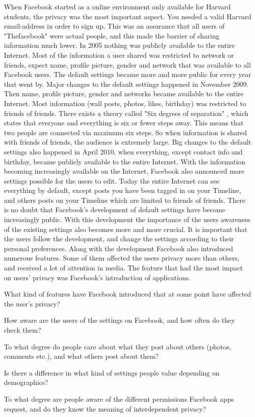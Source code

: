 When Facebook started as a online environment only available for Harvard students, the privacy was the most important aspect. You needed a valid Harvard email-address in order to sign up. This was an assurance that all users of "Thefacebook" were actual people, and this made the barrier of sharing information much lower. In 2005 nothing was publicly available to the entire Internet. Most of the information a user shared was restricted to network or friends, expect name, profile picture, gender and network that was available to all Facebook users. The default settings became more and more public for every year that went by. Major changes to the default settings happened in November 2009. Then name, profile picture, gender and networks became available to the entire Internet. Most information (wall posts, photos, likes, birthday) was restricted to friends of friends. There exists a theory called "Six degrees of separation" \cite{six}, which states that everyone and everything is six or fewer steps away. This means that two people are connected via maximum six steps. So when information is shared with friends of friends, the audience is extremely large. Big changes to the default settings also happened in April 2010, when everything, except contact info and birthday, became publicly available to the entire Internet. With the information becoming increasingly available on the Internet, Facebook also announced more settings possible for the users to edit. Today the entire Internet can see everything by default, except posts you have been tagged in on your Timeline, and others posts on your Timeline which are limited to friends of friends. There is no doubt that Facebook's development of default settings have become increasingly public. With this development the importance of the users awareness of the existing settings also becomes more and more crucial. It is important that the users follow the development, and change the settings according to their personal preferences. Along with the development Facebook also introduced numerous features. Some of them affected the users privacy more than others, and received a lot of attention in media. The feature that had the most impact on users' privacy was Facebook's introduction of applications. 




\item What kind of features have Facebook introduced that at some point have affected the user's privacy?
\item How aware are the users of the settings on Facebook, and how often do they check them?
\item To what degree do people care about what they post about others (photos, comments etc.), and what others post about them? 
\item Is there a difference in what kind of settings people value depending on  demographics?
\item To what degree are people aware of the different permissions Facebook apps request, and do they know the meaning of interdependent privacy?


